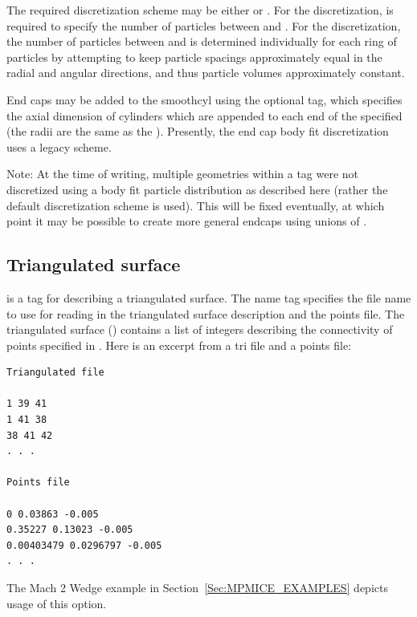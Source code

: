 The required discretization scheme may be either 
 or .  For the
 discretization,   is required to specify the number of particles between  and .  For the  discretization, the number of
particles between  and 
is determined individually for each ring of particles by
attempting to keep particle spacings approximately equal in the radial
and angular directions, and thus particle volumes approximately
constant.

End caps may be added to the smoothcyl using the optional  tag, which specifies the axial
dimension of cylinders which are appended to each end of the specified
 (the radii are the same as the 
).  Presently, the end cap body fit discretization uses a
legacy scheme.

Note: At the time of writing, multiple 
geometries within a  tag were not
discretized using a body fit particle distribution as described here
(rather the default discretization scheme is used).  This will be
fixed eventually, at which point it may be possible to create more
general endcaps using unions of .

\subsection{Triangulated surface}
 is a tag for describing a triangulated surface.
The name tag specifies the file name to use for reading in the
triangulated surface description and the points file.  The
triangulated surface () contains a list of integers
describing the connectivity of points specified in .
Here is an excerpt from a tri file and a points file:

\begin{lstlisting}[backgroundcolor=\color{background}]
Triangulated file

1 39 41
1 41 38
38 41 42
. . .

Points file

0 0.03863 -0.005
0.35227 0.13023 -0.005
0.00403479 0.0296797 -0.005
. . .
\end{lstlisting}
The Mach 2 Wedge example in Section~\ref{Sec:MPMICE_EXAMPLES} depicts usage of
this option.

